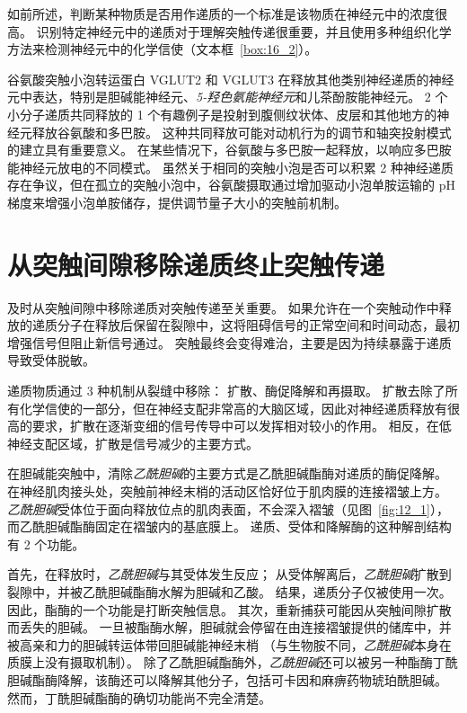如前所述，判断某种物质是否用作递质的一个标准是该物质在神经元中的浓度很高。
识别特定神经元中的递质对于理解突触传递很重要，并且使用多种组织化学方法来检测神经元中的化学信使（文本框~\ref{box:16_2}）。


谷氨酸突触小泡转运蛋白 VGLUT2 和 VGLUT3 在释放其他类别神经递质的神经元中表达，特别是胆碱能神经元、\textit{5-羟色氨能神经元}和儿茶酚胺能神经元。
2 个小分子递质共同释放的 1 个有趣例子是投射到腹侧纹状体、皮层和其他地方的神经元释放谷氨酸和多巴胺。
这种共同释放可能对动机行为的调节和轴突投射模式的建立具有重要意义。
在某些情况下，谷氨酸与多巴胺一起释放，以响应多巴胺能神经元放电的不同模式。
虽然关于相同的突触小泡是否可以积累 2 种神经递质存在争议，但在孤立的突触小泡中，谷氨酸摄取通过增加驱动小泡单胺运输的 pH 梯度来增强小泡单胺储存，提供调节量子大小的突触前机制。



\section{从突触间隙移除递质终止突触传递}

及时从突触间隙中移除递质对突触传递至关重要。
如果允许在一个突触动作中释放的递质分子在释放后保留在裂隙中，这将阻碍信号的正常空间和时间动态，最初增强信号但阻止新信号通过。
突触最终会变得难治，主要是因为持续暴露于递质导致受体脱敏。


递质物质通过 3 种机制从裂缝中移除：
扩散、酶促降解和再摄取。
扩散去除了所有化学信使的一部分，但在神经支配非常高的大脑区域，因此对神经递质释放有很高的要求，扩散在逐渐变细的信号传导中可以发挥相对较小的作用。
相反，在低神经支配区域，扩散是信号减少的主要方式。


在胆碱能突触中，清除\textit{乙酰胆碱}的主要方式是乙酰胆碱酯酶对递质的酶促降解。
在神经肌肉接头处，突触前神经末梢的活动区恰好位于肌肉膜的连接褶皱上方。
\textit{乙酰胆碱}受体位于面向释放位点的肌肉表面，不会深入褶皱（见图~\ref{fig:12_1}），而乙酰胆碱酯酶固定在褶皱内的基底膜上。
递质、受体和降解酶的这种解剖结构有 2 个功能。


首先，在释放时，\textit{乙酰胆碱}与其受体发生反应；
从受体解离后，\textit{乙酰胆碱}扩散到裂隙中，并被乙酰胆碱酯酶水解为胆碱和乙酸。
结果，递质分子仅被使用一次。
因此，酯酶的一个功能是打断突触信息。
其次，重新捕获可能因从突触间隙扩散而丢失的胆碱。
一旦被酯酶水解，胆碱就会停留在由连接褶皱提供的储库中，并被高亲和力的胆碱转运体带回胆碱能神经末梢
（与生物胺不同，\textit{乙酰胆碱}本身在质膜上没有摄取机制）。
除了乙酰胆碱酯酶外，\textit{乙酰胆碱}还可以被另一种酯酶丁酰胆碱酯酶降解，该酶还可以降解其他分子，包括可卡因和麻痹药物琥珀酰胆碱。
然而，丁酰胆碱酯酶的确切功能尚不完全清楚。


